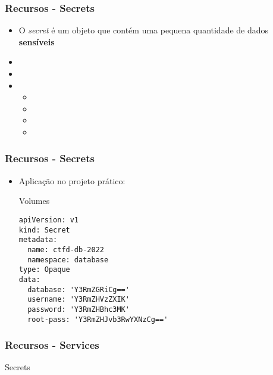 \begin{frame}
\frametitle{Recursos - Secrets}

\begin{itemize}
	\item O \textit{secret} é um objeto que contém uma pequena quantidade de dados \textbf{sensíveis}
	\item {}
	\item {}
	\item {}
		\begin{itemize}
			\item {}
			\item {}
			\item {}
			\item {}
		\end{itemize}
\end{itemize}
\end{frame}

\begin{frame}[containsverbatim]
\frametitle{Recursos - Secrets}
\begin{itemize}
	\item Aplicação no projeto prático:
\begin{center}
\begin{minipage}{0.9\textwidth}
\begin{block}{Volumes}
\begin{lstlisting}
apiVersion: v1
kind: Secret
metadata:
  name: ctfd-db-2022
  namespace: database
type: Opaque
data:
  database: 'Y3RmZGRiCg=='
  username: 'Y3RmZHVzZXIK'
  password: 'Y3RmZHBhc3MK'
  root-pass: 'Y3RmZHJvb3RwYXNzCg=='
\end{lstlisting}
\end{block}
\end{minipage}
\end{center}
\end{itemize}
\end{frame}

\begin{frame}
\frametitle{Recursos - Services}
    Secrets
\end{frame}

